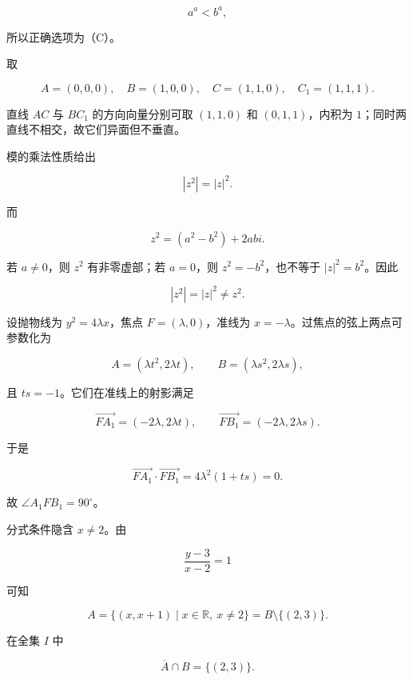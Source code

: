\begin{answer}
\nopagebreak[4]
\[
a^a<b^a,
\]

所以正确选项为（C）。


取

\nopagebreak[4]
\[
A=(0,0,0),\quad B=(1,0,0),\quad
C=(1,1,0),\quad C_1=(1,1,1).
\]

直线 $AC$ 与 $BC_1$ 的方向向量分别可取 $(1,1,0)$ 和 $(0,1,1)$，内积为 $1$；同时两直线不相交，故它们异面但不垂直。


模的乘法性质给出

\nopagebreak[4]
\[
|z^2|=|z|^2.
\]

而

\nopagebreak[4]
\[
z^2=(a^2-b^2)+2abi.
\]

若 $a\ne0$，则 $z^2$ 有非零虚部；若 $a=0$，则 $z^2=-b^2$，也不等于 $|z|^2=b^2$。因此

\nopagebreak[4]
\[
|z^2|=|z|^2\ne z^2.
\]


设抛物线为 $y^2=4\lambda x$，焦点 $F=(\lambda,0)$，准线为 $x=-\lambda$。过焦点的弦上两点可参数化为

\nopagebreak[4]
\[
A=(\lambda t^2,2\lambda t),\qquad
B=(\lambda s^2,2\lambda s),
\]

且 $ts=-1$。它们在准线上的射影满足

\nopagebreak[4]
\[
\overrightarrow{FA_1}=(-2\lambda,2\lambda t),\qquad
\overrightarrow{FB_1}=(-2\lambda,2\lambda s).
\]

于是

\nopagebreak[4]
\[
\overrightarrow{FA_1}\cdot\overrightarrow{FB_1}
=4\lambda^2(1+ts)=0.
\]

故 $\angle A_1FB_1=90^\circ$。


分式条件隐含 $x\ne2$。由

\nopagebreak[4]
\[
\frac{y-3}{x-2}=1
\]

可知

\nopagebreak[4]
\[
A=\{(x,x+1)\mid x\in\mathbb R,\ x\ne2\}
=B\setminus\{(2,3)\}.
\]

在全集 $I$ 中

\nopagebreak[4]
\[
\overline A\cap B=\{(2,3)\}.
\]


\end{answer}
